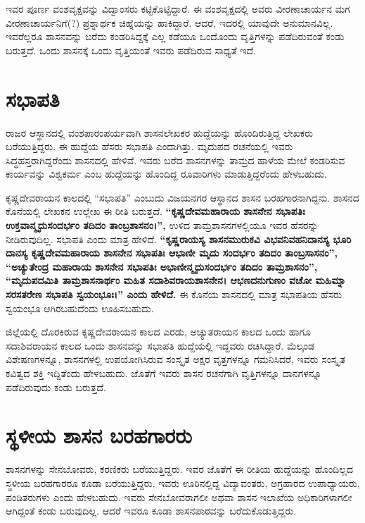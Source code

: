 ಇವರ ಪೂರ್ಣ ವಂಶವೃಕ್ಷವನ್ನು ವಿದ್ವಾಂಸರು ಕಟ್ಟಿಕೊಟ್ಟಿದ್ದಾರೆ. ಈ ವಂಶವೃಕ್ಷದಲ್ಲಿ ಅವರು ವೀರಣಾಚಾರ್ಯನ ಮಗ ವೀರಣಾಚಾರ್ಯನಿಗೆ(?) ಪ್ರಶ್ನಾರ್ಥಕ ಚಿಹ್ನೆಯನ್ನು ಹಾಕಿದ್ದಾರೆ. ಆದರೆ, ಇದರಲ್ಲಿ ಯಾವುದೇ ಅನುಮಾನವಿಲ್ಲ. ಇವರೆಲ್ಲರೂ ಶಾಸನವನ್ನು ಬರೆದು ಕಂಡರಿಸಿದ್ದಕ್ಕೆ ಎಲ್ಲ ಕಡೆಯೂ ಒಂದೊಂದು ವೃತ್ತಿಗಳನ್ನು ಪಡೆದಿರುವಂತೆ ಕಂಡು ಬರುತ್ತದೆ. ಒಂದು ಶಾಸನಕ್ಕೆ ಒಂದು ವೃತ್ತಿಯಂತೆ ಇವರು ಪಡೆದಿರುವ ಸಾಧ್ಯತೆ ಇದೆ.


\section{ಸಭಾಪತಿ}

ರಾಜರ ಆಸ್ಥಾನದಲ್ಲಿ ವಂಶಪಾರಂಪರ್ಯವಾಗಿ ಶಾಸನಲೇಖಕರ ಹುದ್ದೆಯನ್ನು ಹೊಂದಿರುತ್ತಿದ್ದ ಲೇಖಕರು ಬರೆಯುತ್ತಿದ್ದರು. ಈ ಹುದ್ದೆಯ ಹೆಸರು ಸಭಾಪತಿ ಎಂದಾಗಿತ್ತು. ಮೃದುಪದ ರಚನೆಯಲ್ಲಿ ಇವರು ಸಿದ್ಧಹಸ್ತರಾಗಿದ್ದರೆಂದು ಶಾಸನದಲ್ಲಿ ಹೇಳಿವೆ. ಇವರು ಬರೆದ ಶಾಸನಗಳನ್ನು ತಾಮ್ರದ ಹಾಳೆಯ ಮೇಲೆ ಕಂಡರಿಸುವ ಕಾರ್ಯವನ್ನು ವಿಶ್ವಕರ್ಮ ಎಂಬ ಹುದ್ದೆಯನ್ನು ಹೊಂದಿದ್ದ ರೂವಾರಿಗಳು ಮಾಡುತ್ತಿದ್ದರೆಂದು ಹೇಳಬಹುದು.

ಕೃಷ್ಣದೇವರಾಯನ ಕಾಲದಲ್ಲಿ “ಸಭಾಪತಿ” ಎಂಬುದು ವಿಜಯನಗರ ಆಸ್ಥಾನದ ಶಾಸನ ಬರಹಗಾರನಾಗಿದ್ದನು. ಶಾಸನದ ಕೊನೆಯಲ್ಲಿ ಲೇಖಕನ ಉಲ್ಲೇಖ ಈ ರೀತಿ ಬರುತ್ತದೆ. \textbf{“ಕೃಷ್ಣದೇವಮಹಾರಾಯ ಶಾಸನೇನ ಸಭಾಪತಿಃ ಉಕ್ತವಾನ್ಮೃದುಸಂದರ್ಭಂ ತದಿದಂ ತಾಂಬ್ರಶಾಸನಂ।”,} ಉಳಿದ ತಾಮ್ರಶಾಸನಗಳಲ್ಲಿಯೂ ಇವರ ಹೆಸರನ್ನು ನೀಡಿರುವುದಿಲ್ಲ. ಸಭಾಪತಿ ಎಂದು ಮಾತ್ರ ಹೇಳಿದೆ. \textbf{“ಕೃಷ್ಣರಾಯಸ್ಯ ಶಾಸನಮುರುಕವಿ ವಿಭವನಿವಹನಿದಾನಸ್ಯ ಭೂರಿ ದಾನಸ್ಯ ಕೃಷ್ಣದೇವಮಹಾರಾಯ ಶಾಸನೇನ ಸಭಾಪತಿಃ ಆಭಾಣೀ ಮೃದು ಸಂದರ್ಭಂ ತದಿದಂ ತಾಂಬ್ರಸಾಸನಂ”, “ಅಚ್ಯುತೇಂದ್ರ ಮಹಾರಾಯ ಶಾಸನೇನ ಸಭಾಪತಿಃ ಅಭಾಣೀನ್ಮೃದುಸಂದರ್ಭಂ ತದಿದಂ ತಾಮ್ರಶಾಸನಂ”, “ಮೃದುಪದಮಿತಿ ತಾಮ್ರಶಾಸನಾರ್ಥಂ ಮಹಿತ ಸದಾಶಿವ\-ರಾಯಶಾಸನೇನ। ಆಭಣದನುಗುಣಂ ವಚೋ ಮಹಿಮ್ನಾ ಸರಸತರೇಣ ಸಭಾಪತಿ ಸ್ವಯಂಭೂಃ।” ಎಂದು ಹೇಳಿದೆ. }ಈ ಕೊನೆಯ ಶಾಸನದಲ್ಲಿ ಮಾತ್ರ ಸಭಾಪತಿಯ ಹೆಸರು ಸ್ವಯಂಭೂ ಆಗಿರಬಹುದೆಂದು ಊಹಿಸಬಹುದು.

ಜಿಲ್ಲೆಯಲ್ಲಿ ದೊರಕಿರುವ ಕೃಷ್ಣದೇವರಾಯನ ಕಾಲದ ಎರಡು, ಅಚ್ಯುತರಾಯನ ಕಾಲದ ಒಂದು ಹಾಗೂ ಸದಾಶಿವರಾಯನ ಕಾಲದ ಒಂದು ಶಾಸನವನ್ನು ಸಭಾಪತಿ ಹುದ್ದೆಯಲ್ಲಿ ಇದ್ದವರು ರಚಿಸಿದ್ದಾರೆ. ಮೆಲ್ಕಂಡ ವಿಶೇಷಣಗಳನ್ನೂ, ಶಾಸನಗಳಲ್ಲಿ ಉಪಯೋಗಿಸಿರುವ ಸಂಸ್ಕೃತ ಅಕ್ಷರ ವೃತ್ತಗಳನ್ನೂ ಗಮನಿಸಿದರೆ, ಇವರು ಸಂಸ್ಕೃತ ಕವಿತ್ವದ ಶಕ್ತಿ ಇದ್ದಿತೆಂದು ಹೇಳಬಹುದು. ಜೊತೆಗೆ ಇವರು ಶಾಸನ ರಚನೆಗಾಗಿ ವೃತ್ತಿಗಳನ್ನೂ ದಾನಗಳನ್ನೂ ಪಡೆದಿರುವುದು ಕಂಡು ಬರುತ್ತದೆ.


\section{ಸ್ಥಳೀಯ ಶಾಸನ ಬರಹಗಾರರು}

ಶಾಸನಗಳನ್ನು ಸೇನಬೋವರು, ಕರಣಿಕರು ಬರೆಯುತ್ತಿದ್ದರು. ಇವರ ಜೊತೆಗೆ ಈ ರೀತಿಯ ಹುದ್ದೆಯನ್ನು ಹೊಂದಿಲ್ಲದ ಸ್ಥಳೀಯ ಬರಹಗಾರರೂ ಕೂಡಾ ಬರೆಯುತ್ತಿದ್ದರು. ಇವರು ಊರಿನಲ್ಲಿದ್ದ ವಿದ್ಯಾವಂತರು, ಅಗ್ರಹಾರದ ಉಪಾಧ್ಯಾಯರು, ಪಂಡಿತರುಗಳು ಎಂದು ಹೇಳಬಹುದು. ಇವರು ಸೇನಬೋವರಾಗಲೀ ಅಥವಾ ಶಾಸನ ಇಲಾಖೆಯ ಅಧಿಕಾರಿಗಳಾಗಲೀ ಆಗಿದ್ದಂತೆ ಕಂಡು ಬರುವುದಿಲ್ಲ. ಆದರೆ ಇವರೂ ಕೂಡಾ ಶಾಸನಪಾಠವನ್ನು ಬರೆದುಕೊಡುತ್ತಿದ್ದರು.

